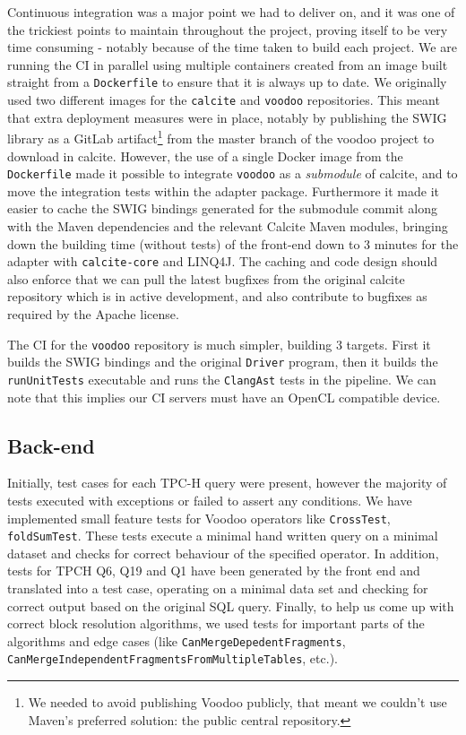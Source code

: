Continuous integration was a major point we had to deliver on, and it was one of the trickiest points to maintain throughout the project, proving itself to be very time consuming - notably because of the time taken to build each project. We are running the CI in parallel using multiple containers created from an image built straight from a \texttt{Dockerfile} to ensure that it is always up to date. We originally used two different images for the \texttt{calcite} and \texttt{voodoo} repositories. This meant that extra deployment measures were in place, notably by publishing the SWIG library as a GitLab artifact\footnote{We needed to avoid publishing Voodoo publicly, that meant we couldn't use Maven's preferred solution: the public central repository.} from the master branch of the voodoo project to download in calcite. However, the use of a single Docker image from the \texttt{Dockerfile} made it possible to integrate \texttt{voodoo} as a \textit{submodule} of calcite, and to move the integration tests within the adapter package. Furthermore it made it easier to cache the SWIG bindings generated for the submodule commit along with the Maven dependencies and the relevant Calcite Maven modules, bringing down the building time (without tests) of the front-end down to 3 minutes for the adapter with \texttt{calcite-core} and LINQ4J. The caching and code design should also enforce that we can pull the latest bugfixes from the original calcite repository which is in active development, and also contribute to bugfixes as required by the Apache license.

The CI for the \texttt{voodoo} repository is much simpler, building 3 targets. First it builds the SWIG bindings and the original \texttt{Driver} program, then it builds the \texttt{runUnitTests} executable and runs the \texttt{ClangAst} tests in the pipeline. We can note that this implies our CI servers must have an OpenCL compatible device.

\subsection{Back-end}

Initially, test cases for each TPC-H query were present, however the majority of tests executed with exceptions or failed to assert any conditions. We have implemented small feature tests for Voodoo operators like \texttt{CrossTest}, \texttt{foldSumTest}. These tests execute a minimal hand written query on a minimal dataset and checks for correct behaviour of the specified operator. In addition, tests for TPCH Q6, Q19 and Q1 have been generated by the front end and translated into a test case, operating on a minimal data set and checking for correct output based on the original SQL query. Finally, to help us come up with correct block resolution algorithms, we used tests for important parts of the algorithms and edge cases (like \texttt{CanMergeDepedentFragments}, \texttt{CanMergeIndependentFragmentsFromMultipleTables}, etc.). 

